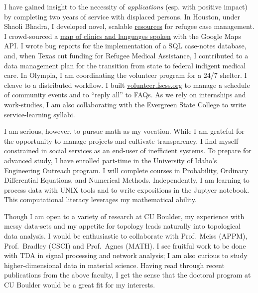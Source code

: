 \documentclass{article}
\begin{document}
I have gained insight to the necessity of \emph{applications} (esp. with
positive impact) by completing two years of service with displaced persons.
In Houston, under Shaoli Bhadra, I developed novel, scalable
\href{https://github.com/coltongrainger/ymca-resources}{resources} for
refugee case management. I crowd-sourced a
\href{https://drive.google.com/open?id=1kk9yn6-4nifHLIf2tGYbW_7PiYo\&usp=sharing}{map
of clinics and languages spoken} with the Google Maps API. I wrote bug
reports for the implementation of a SQL case-notes database, and, when
Texas cut funding for Refugee Medical Assistance, I contributed to a
data management plan for the transition from state to federal indigent
medical care. In Olympia, I am coordinating the volunteer program for a
24/7 shelter. I cleave to a distributed workflow. I built
\href{https://volunteer.fscss.org}{volunteer.fscss.org} to manage a
schedule of community events and to ``reply all'' to FAQs. As we rely on
internships and work-studies, I am also collaborating with the 
Evergreen State College to write service-learning syllabi. 

I am serious, however, to pursue math as my vocation. While I am
grateful for the opportunity to manage projects and cultivate
transparency, I find myself constrained in social services
as an end-user of inefficient systems.
To prepare for advanced study, I have enrolled part-time in 
the University of Idaho's Engineering Outreach
program. I will complete courses in Probability, Ordinary Differential
Equations, and Numerical Methods.  Independently, I am
learning to process data with UNIX tools and to write 
expositions in the Juptyer notebook. This computational literacy leverages 
my mathematical ability.

Though I am open to a variety of research at CU Boulder,
my experience with messy data-sets and my appetite for topology leads
naturally into topological data analysis. I would be enthusiastic to
collaborate with Prof.\ Meiss (APPM), Prof.\ Bradley (CSCI) and Prof.\ Agnes
(MATH). I see fruitful work to be done with TDA in signal processing and
network analysis; I am also curious to study higher-dimensional data in
material science. Having read through
recent publications from the above faculty, I get the sense that the
doctoral program at CU Boulder would be a great fit for my
interests.
\end{document}
